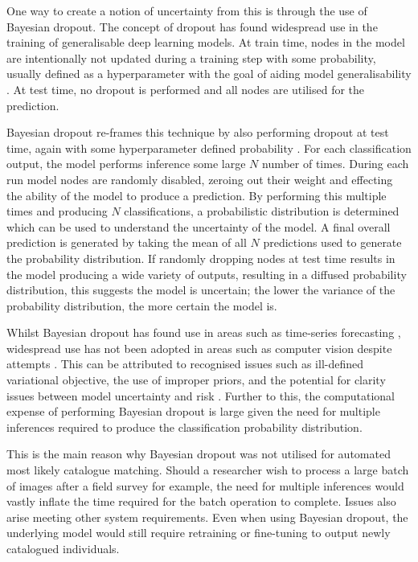 One way to create a notion of uncertainty from this is through the use of Bayesian dropout. The concept of dropout has found widespread use in the training of generalisable deep learning models. At train time, nodes in the model are intentionally not updated during a training step with some probability, usually defined as a hyperparameter with the goal of aiding model generalisability \cite{srivastava_dropout:_2014}. At test time, no dropout is performed and all nodes are utilised for the prediction. 

Bayesian dropout re-frames this technique by also performing dropout at test time, again with some hyperparameter defined probability \cite{gal_dropout_2016}. For each classification output, the model performs inference some large $N$ number of times. During each run model nodes are randomly disabled, zeroing out their weight and effecting the ability of the model to produce a prediction. By performing this multiple times and producing $N$ classifications, a probabilistic distribution is determined which can be used to understand the uncertainty of the model. A final overall prediction is generated by taking the mean of all $N$ predictions used to generate the probability distribution. If randomly dropping nodes at test time results in the model producing a wide variety of outputs, resulting in a diffused probability distribution, this suggests the model is uncertain; the lower the variance of the probability distribution, the more certain the model is. 

Whilst Bayesian dropout has found use in areas such as time-series forecasting \cite{laptev_time-series_2017}, widespread use has not been adopted in areas such as computer vision despite attempts \cite{kendall_what_2017}. This can be attributed to recognised issues such as ill-defined variational objective, the use of improper priors, and the potential for clarity issues between model uncertainty and risk \cite{hron_variational_2018, osband_risk_2016}. Further to this, the computational expense of performing Bayesian dropout is large given the need for multiple inferences required to produce the classification probability distribution.

This is the main reason why Bayesian dropout was not utilised for automated most likely catalogue matching. Should a researcher wish to process a large batch of images after a field survey for example, the need for multiple inferences would vastly inflate the time required for the batch operation to complete. Issues also arise meeting other system requirements. Even when using Bayesian dropout, the underlying model would still require retraining or fine-tuning to output newly catalogued individuals. 

